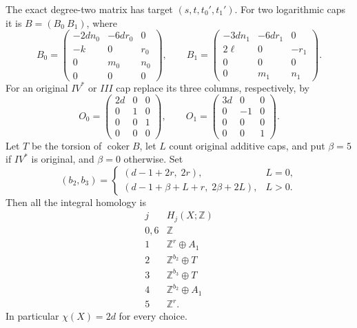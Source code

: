 The exact degree-two matrix has target $(s,t,t_0',t_1')$.
For two logarithmic caps it is $B=(B_0\ B_1)$, where
\[
 B_0=
 \begin{pmatrix}
 -2dn_0&-6dr_0&0\\
 -k&0&r_0\\
 0&m_0&n_0\\
 0&0&0
 \end{pmatrix},
 \qquad
 B_1=
 \begin{pmatrix}
 -3dn_1&-6dr_1&0\\
 2\ell&0&-r_1\\
 0&0&0\\
 0&m_1&n_1
 \end{pmatrix}.                                           \tag{D.WE3}
\]
For an original $IV^*$ or $III$ cap replace its three
columns, respectively, by
\[
 O_0=
 \begin{pmatrix}2d&0&0\\0&1&0\\0&0&1\\0&0&0\end{pmatrix},
 \qquad
 O_1=
 \begin{pmatrix}3d&0&0\\0&-1&0\\0&0&0\\0&0&1\end{pmatrix}.
                                                               \tag{D.WE4}
\]
Let $T$ be the torsion of $\operatorname{coker}B$,
let $L$ count original additive caps, and put
$\beta=5$ if $IV^*$ is original, and $\beta=0$ otherwise.
Set
\[
 (b_2,b_3)=
 \begin{cases}
 (d-1+2r,\;2r),&L=0,\\
 (d-1+\beta+L+r,\;2\beta+2L),&L>0.
 \end{cases}                                               \tag{D.WE5}
\]
Then all the integral homology is
\[
\begin{array}{c|c}
j&H_j(X;\mathbb Z)\\\hline
0,6&\mathbb Z\\
1&\mathbb Z^r\oplus A_1\\
2&\mathbb Z^{b_2}\oplus T\\
3&\mathbb Z^{b_3}\oplus T\\
4&\mathbb Z^{b_2}\oplus A_1\\
5&\mathbb Z^r .
\end{array}                                                \tag{D.WE6}
\]
In particular $\chi(X)=2d$ for every choice.

